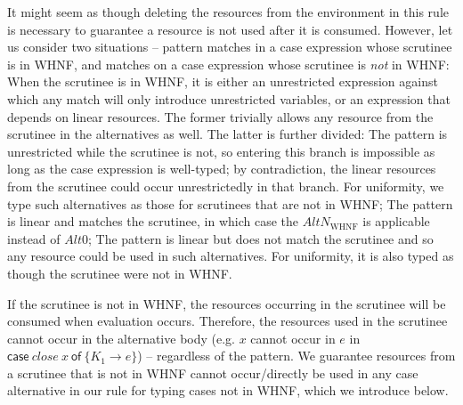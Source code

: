 \documentclass[acmsmall,review,anonymous]{acmart}
\newcommand{\ccase}[2]{\mathsf{case}~#1~\mathsf{of}~#2}
\begin{document}
It might seem as though deleting the resources from the environment in this
rule is necessary to guarantee a resource is not used after it is consumed.
%
However, let us consider two situations -- pattern matches in a case
expression whose scrutinee is in WHNF, and matches on a case expression whose
scrutinee is \emph{not} in WHNF:
%
When the scrutinee is in WHNF, it is either an unrestricted expression
against which any match will only introduce unrestricted variables, or an
expression that depends on linear resources. The former trivially allows
any resource from the scrutinee in the alternatives as well. The latter is
further divided: 
%
The pattern is unrestricted while the
scrutinee is not, so entering this branch is impossible as long as the case
expression is well-typed; by contradiction, the linear resources from the
scrutinee could occur unrestrictedly in that branch.
%
For uniformity, we type such alternatives as those for scrutinees that
are not in WHNF;
%
The pattern is linear and matches the scrutinee, in which case the
$AltN_{\textrm{WHNF}}$ is applicable instead of $Alt0$;
%
The pattern is linear but does not match the scrutinee and so any
resource could be used in such alternatives. For uniformity,
it is also typed as though the scrutinee were not in WHNF.

If the scrutinee is not in WHNF, the resources occurring in the
scrutinee will be consumed when evaluation occurs. Therefore, the resources
used in the scrutinee cannot occur in the alternative body
(e.g. $x$ cannot occur in $e$ in $\ccase{close~x}{\{K_1 \to e\}}$)
-- regardless of the pattern.
%
%
We guarantee resources from a scrutinee that is not in WHNF
cannot occur/directly be used in any case alternative in our rule for typing
cases not in WHNF, which we introduce below.


\end{document}
